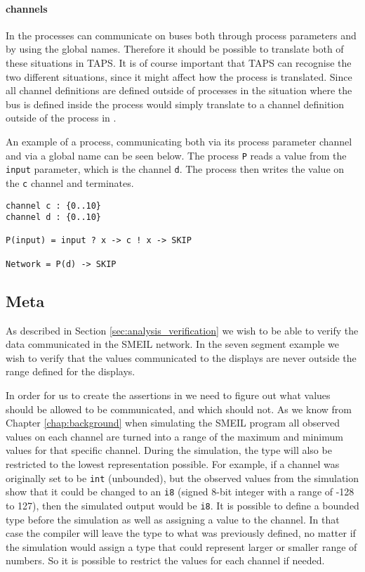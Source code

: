 \paragraph{\cspm{} channels}
In \cspm{} the processes can communicate on buses both through process parameters and by using the global names. Therefore it should be possible to translate both of these situations in TAPS. It is of course important that TAPS can recognise the two different situations, since it might affect how the process is translated. Since all channel definitions are defined outside of processes in \cspm{} the situation where the bus is defined inside the process would simply translate to a channel definition outside of the process in \cspm{}.

An example of a \cspm{} process, communicating both via its process parameter channel and via a global name can be seen below. The process \texttt{P} reads a value from the \texttt{input} parameter, which is the channel \texttt{d}. The process then writes the value on the \texttt{c} channel and terminates.
\begin{verbatim}
channel c : {0..10}
channel d : {0..10}

P(input) = input ? x -> c ! x -> SKIP

Network = P(d) -> SKIP
\end{verbatim}

\subsection{Meta}
As described in Section \ref{sec:analysis_verification} we wish to be able to verify the data communicated in the SMEIL network. In the seven segment example we wish to verify that the values communicated to the displays are never outside the range defined for the displays.

In order for us to create the assertions in \cspm{} we need to figure out what values should be allowed to be communicated, and which should not.
As we know from Chapter \ref{chap:background} when simulating the SMEIL program all observed values on each channel are turned into a range of the maximum and minimum values for that specific channel. During the simulation, the type will also be restricted to the lowest representation possible. For example, if a channel was originally set to be \texttt{int} (unbounded), but the observed values from the simulation show that it could be changed to an \texttt{i8} (signed 8-bit integer with a range of -128 to 127), then the simulated output would be \texttt{i8}.
It is possible to define a bounded type before the simulation as well as assigning a value to the channel. In that case the compiler will leave the type to what was previously defined, no matter if the simulation would assign a type that could represent larger or smaller range of numbers. So it is possible to restrict the values for each channel if needed.

